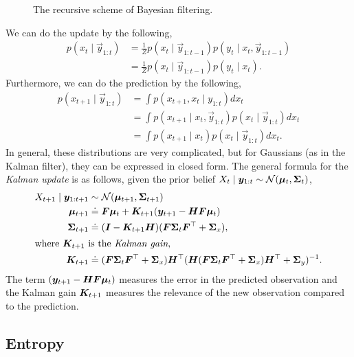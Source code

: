 \begin{figure}[h!]
    \centering
    \caption{The recursive scheme of Bayesian filtering.}
    \label{fig:bayesian-filtering}
\end{figure}

We can do the update by the following,
\begin{align*}
  p(x_t \mid \vec{y}_{1:t}) &= \frac{1}{Z} p(x_t \mid \vec{y}_{1:t-1}) p(y_t\mid x_t, \vec{y}_{1:t-1}) \\
  &= \frac{1}{Z} p(x_t \mid \vec{y}_{1:t-1}) p(y_t\mid x_t)
.\end{align*}
Furthermore, we can do the prediction by the following,
\begin{align*}
  p(x_{t+1}\mid \vec{y}_{1:t}) &= \int p(x_{t+1}, x_t \mid y_{1:t}) dx_t \\
  &= \int p(x_{t+1} \mid x_t, \vec{y}_{1:t}) p(x_t\mid \vec{y}_{1:t}) dx_t \\
  &= \int p(x_{t+1} \mid x_t) p(x_t\mid \vec{y}_{1:t}) dx_t
.\end{align*}
In general, these distributions are very complicated, but for Gaussians (as in
the Kalman filter), they can be expressed in closed form. The general formula
for the \textit{Kalman update} is as follows, given the prior belief $X_t \mid
\bm{y}_{1:t} \sim \mathcal{N}(\bm{\mu}_t, \bm{\Sigma}_t)$,
\begin{align*}
  X_{t+1} \mid \bm{y}_{1:t+1} &\sim \mathcal{N}(\bm{\mu}_{t+1}, \bm{\Sigma}_{t+1}) \\
  \bm{\mu}_{t+1} &\doteq \bm{F} \bm{\mu}_t + \bm{K}_{t+1}(\bm{y}_{t+1} - \bm{H}\bm{F} \bm{\mu}_t) \\
  \bm{\Sigma}_{t+1} &\doteq (\bm{I} - \bm{K}_{t+1} \bm{H}) (\bm{F}\bm{\Sigma}_t\bm{F}^\top + \bm{\Sigma}_x), \\
  \intertext{where $\bm{K}_{t+1}$ is the \textit{Kalman gain},}
  \bm{K}_{t+1} &\doteq (\bm{F}\bm{\Sigma}_t \bm{F}^\top + \bm{\Sigma}_x) \bm{H}^\top (\bm{H}(\bm{F}\bm{\Sigma}_t\bm{F}^\top + \bm{\Sigma}_x) \bm{H}^\top + \bm{\Sigma}_y)^{-1}
.\end{align*}
The term $(\bm{y}_{t+1} - \bm{H}\bm{F}\bm{\mu}_t)$ measures the error in the
predicted observation and the Kalman gain $\bm{K}_{t+1}$ measures the relevance
of the new observation compared to the prediction.

\subsection{Entropy}

